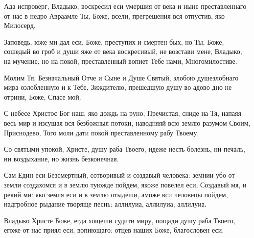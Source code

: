 \begin{mymulticols}

Ада испроверг, Владыко, воскресил еси умершия от века и ныне преставленнаго от нас в недро Авраамле Ты, Боже, всели, прегрешения вся отпустив, яко Милосерд.


Заповедь, юже ми дал еси, Боже, преступих и смертен бых, но Ты, Боже, сошедый во гроб и души яже от века воскресивый, не возстави мене, Владыко, на мучение, но на покой, преставленный вопиет Тебе нами, Многомилостиве. 

\slava

Молим Тя, Безначальный Отче и Сыне и Душе Святый, злобою душезлобнаго мира озлобленную и к Тебе, Зиждителю, прешедшую душу во адово дно не отрини, Боже, Спасе мой.

\inyne

С небесе Христос Бог наш, яко дождь на руно, Пречистая, сниде на Тя, напаяя весь мир и изсушая вся безбожныя потоки, наводняяй всю землю разумом Своим, Приснодево, Того моли дати покой преставленному рабу Твоему.

\vspace{\baselineskip}

Со святыми упокой, Христе, душу раба Твоего, идеже несть болезнь, ни печаль, ни воздыхание, но жизнь безконечная. 

\vspace{\baselineskip}

Сам Един еси Безсмертный, сотворивый и создавый человека: земнии убо от земли создахомся и в землю туюжде пойдем, якоже повелел еси, Создавый мя, и рекий ми: яко земля еси и в землю отыдеши, аможе вси человецы пойдем, надгробное рыдание творяще песнь: аллилуиа, аллилуиа, аллилуиа.

\vspace{\baselineskip}



Владыко Христе Боже, егда хощеши судити миру, пощади душу раба Твоего, егоже от нас приял еси, вопиющаго: отцев наших Боже, благословен еси. 



\end{mymulticols}
